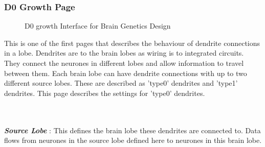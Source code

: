\documentclass[11pt,twoside,a4paper]{article}
\begin{document}
\subsubsection{D0 Growth Page}

\begin{minipage}{0.6\linewidth}
\begin{figure}[H]
	\centerline {} %
	\caption{D0 growth Interface for Brain Genetics Design}
	\label{fig:brain_d0growth}
\end{figure}
\end{minipage}
\begin{minipage}{0.1\linewidth}\end{minipage}
\begin{minipage}{0.4\linewidth}
This is one of the first pages that describes the behaviour of dendrite connections in a lobe. Dendrites are to the brain lobes as wiring is to integrated circuits. They connect the neurones in different lobes and allow information to travel between them. Each brain lobe can have dendrite connections with up to two different source lobes. These are described as 'type0' dendrites and 'type1' dendrites. This page describes the settings for 'type0' dendrites.
\end{minipage}~\\~\\


\textbf{\textit{Source Lobe}} : This defines the brain lobe these dendrites are connected to. Data flows from neurones in the source lobe defined here to neurones in this brain lobe. ~\\ %
\end{document}
